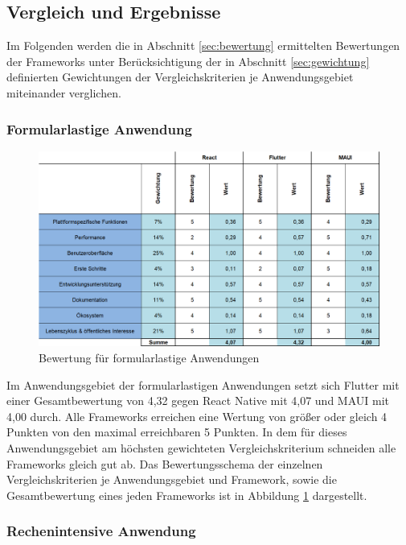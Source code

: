 \documentclass[]{lni}
\begin{document}
\subsection{Vergleich und Ergebnisse}
Im Folgenden werden die in Abschnitt \ref{sec:bewertung} ermittelten Bewertungen der Frameworks unter Berücksichtigung der in Abschnitt \ref{sec:gewichtung} definierten Gewichtungen der Vergleichskriterien je Anwendungsgebiet miteinander verglichen.

\subsubsection{Formularlastige Anwendung}

\begin{figure}[ht]
	\centering
	\includegraphics[width=0.8\linewidth]{images/AnalyseFormularlastig.png}
	\caption{Bewertung für formularlastige Anwendungen}
	\label{fig:analFormular}
\end{figure}

Im Anwendungsgebiet der formularlastigen Anwendungen setzt sich Flutter mit einer Gesamtbewertung von 4,32 gegen React Native mit 4,07 und MAUI mit 4,00 durch. Alle Frameworks erreichen eine Wertung von größer oder gleich 4 Punkten von den maximal erreichbaren 5 Punkten. In dem für dieses Anwendungsgebiet am höchsten gewichteten Vergleichskriterium schneiden alle Frameworks gleich gut ab. Das Bewertungsschema der einzelnen Vergleichskriterien je Anwendungsgebiet und Framework, sowie die Gesamtbewertung eines jeden Frameworks ist in Abbildung \ref{fig:analFormular} dargestellt.


\subsubsection{Rechenintensive Anwendung}
\end{document}
